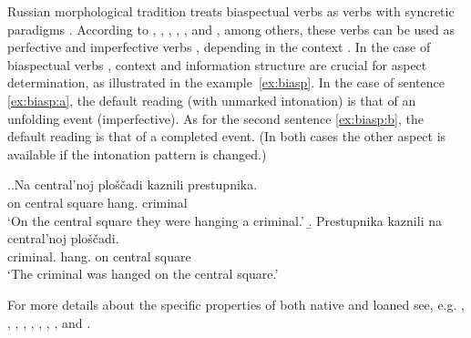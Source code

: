 Russian morphological tradition treats biaspectual verbs  as verbs with syncretic paradigms  . According to \citet{Galton:76}, \citet{Rosenthal:76}, \citet{Shvedova:82}, \citet{Certkova:96}, \citet{ZaliznjakShmelev:00}, and \citet{Janda:07a}, among others,  these verbs can be used as perfective and imperfective verbs , depending in the context  . In the case of biaspectual verbs , context   and information structure   are crucial for aspect determination, as illustrated in the example~\ref{ex:biasp}. In the case of sentence \ref{ex:biasp:a}, the default reading (with unmarked intonation) is that of an unfolding event (imperfective). As for the second sentence \ref{ex:biasp:b}, the default reading is that of a completed event. (In both cases the other aspect is available if the intonation pattern is changed.)

\ex.\label{ex:biasp}\a.\label{ex:biasp:a}\gll Na central'noj plo\v{s}\v{c}adi kaznili\textsuperscript{\IPF} prestupnika.\\
on central square hang. criminal\\
\glt `On the central square they were hanging a criminal.'
\b.\label{ex:biasp:b} \gll Prestupnika kaznili\textsuperscript{\PF} na central'noj plo\v{s}\v{c}adi.\\
criminal. hang. on central square\\
\glt `The criminal was hanged on the central square.'

For more details about the specific properties of both native and loaned    see, e.g. \citet{Isachenko:60}, \citet{Avilova:68}, \citet{Skott:79}, \citet{Gladney:82}, \citet{Certkova:98}, \citet{Jaszay:99}, \citet{Anderson:02}, \citet{Timberlake:04}, and \citet{Janda:07a}. 

